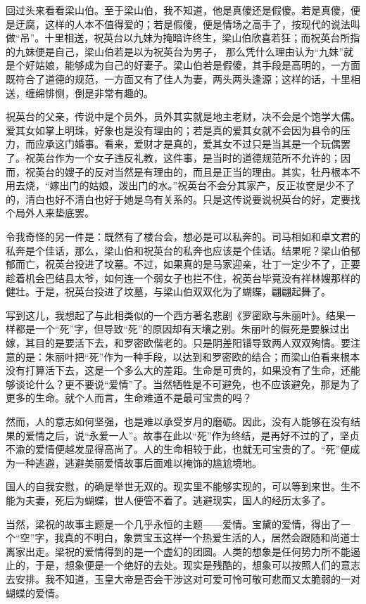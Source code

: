 回过头来看看梁山伯。至于梁山伯，我不知道，他是真傻还是假傻。若是真傻，便是迂腐，这样的人本不值得爱的；若是假傻，便是情场之高手了，按现代的说法叫做“吊”。十里相送，祝英台以九妹为掩暗许终生，梁山伯欣喜若狂；而祝英台所指的九妹便是自己，梁山伯若是以为祝英台为男子， 那么凭什么理由认为“九妹”就是个好姑娘，能够成为自己的好妻子。梁山伯若是假傻，其手段是高明的，一方面既符合了道德的规范，一方面又有了佳人为妻，两头两头逢源；这样的话，十里相送，缠绵悱恻，倒是非常有趣的。
	
祝英台的父亲，传说中是个员外，员外其实就是地主老财，决不会是个饱学大儒。爱其女如掌上明珠，好象也是没有理由的；若是真的爱其女就不会因为县令的压力，而应承这门婚事。看来，爱财才是真的，爱其女不过只是当其是一个玩偶罢了。祝英台作为一个女子违反礼教，这件事，是当时的道德规范所不允许的；因而，祝英台的嫂子的反对当然是有理由的，而且是正当的理由。其实，牡丹根本不用去烧，“嫁出门的姑娘，泼出门的水。”祝英台不会分其家产，反正妆奁是少不了的，清白也好不清白也好于她是乌有关系的。只是这传说要说祝英台的好，定要找个局外人来垫底罢。
	
令我奇怪的另一件是：既然有了楼台会，想必是可以私奔的。司马相如和卓文君的私奔是个佳话，那么，梁山伯和祝英台的私奔也应该是个佳话。结果呢？梁山伯郁郁而亡，祝英台投进了坟墓。不过，如果真的是马家迎亲，壮丁一定少不了，正要趁着机会巴结县太爷，如何连一个弱女子也拦不住，祝英台毕竟没有祥林嫂那样的健壮。于是，祝英台投进了坟墓，与梁山伯双双化为了蝴蝶，翩翩起舞了。
	
写到这儿，我想起了与此相类似的一个西方著名悲剧《罗密欧与朱丽叶》。结果一样都是一个“死”字，但导致“死”的原因却有天壤之别。朱丽叶的假死是要躲过出嫁，其目的是要活下去，和罗密欧偕老的。只是阴差阳错导致两人双双殉情。要注意的是：朱丽叶把“死”作为一种手段，以达到和罗密欧的结合；而梁山伯看来根本没有打算活下去，这是一个多么大的差距。生命是可贵的，如果没有了生命，还能够谈论什么？更不要说“爱情”了。当然牺牲是不可避免，也不应该避免，那是为了更多的生命。就个人而言，生命难道不是最可宝贵的吗？
	
然而，人的意志如何坚强，也是难以承受岁月的磨砺。因此，没有人能够在没有结果的爱情之后，说“永爱一人”。故事在此以“死”作为终结，是再好不过的了，坚贞不渝的爱情便越发显得高尚了。人的生命相较于此，也就无可宝贵的了。“死”便成为一种逃避，逃避美丽爱情故事后面难以掩饰的尴尬境地。
	
国人的自我安慰，的确是举世无双的。现实里不能够实现的，可以等到来世。生不能为夫妻，死后为蝴蝶，世人便管不着了。逃避现实，国人的经历太多了。
	
当然，梁祝的故事主题是一个几乎永恒的主题——爱情。宝黛的爱情，得出了一个“空”字，我真的不明白，象贾宝玉这样一个热爱生活的人，居然会跟随和尚道士离家出走。梁祝的爱情得到的是一个虚幻的团圆。人类的想象是任何势力所不能遏止的，于是，想象便是一个绝好的去处。现实是残酷的，想象可以按照人们的意志去安排。我不知道，玉皇大帝是否会干涉这对可爱可怜可敬可悲而又太脆弱的一对蝴蝶的爱情。
	
